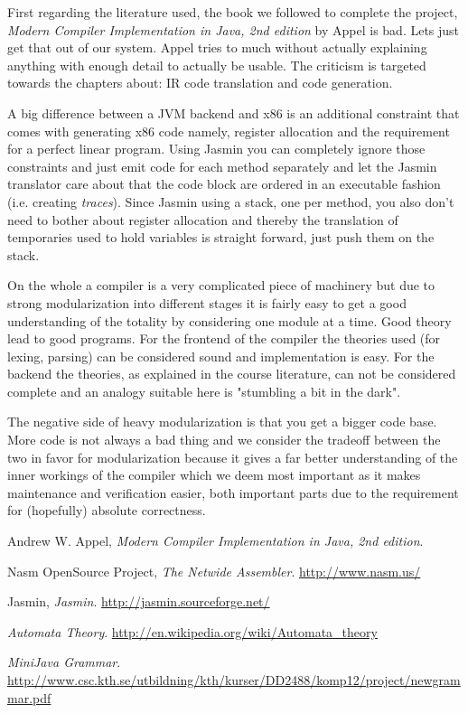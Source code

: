 \documentclass[11pt]{amsart}
\begin{document}
First regarding the literature used, the book we followed to complete the project, \textit{Modern Compiler Implementation in Java, 2nd edition} by Appel\cite{appel} is bad. Lets just get that out of our system. Appel tries to much without actually explaining anything with enough detail to actually be usable. The criticism is targeted towards the chapters about: IR code translation and code generation.

A big difference between a JVM backend and x86 is an additional constraint that comes with generating x86 code namely, register allocation and the requirement for a perfect linear program. Using Jasmin you can completely ignore those constraints and just emit code for each method separately and let the Jasmin translator care about that the code block are ordered in an executable fashion (i.e. creating \textit{traces}). Since Jasmin using a stack, one per method, you also don't need to bother about register allocation and thereby the translation of temporaries used to hold variables is straight forward, just push them on the stack.

On the whole a compiler is a very complicated piece of machinery but due to strong modularization into different stages it is fairly easy to get a good understanding of the totality by considering one module at a time. Good theory lead to good programs. For the frontend of the compiler the theories used (for lexing, parsing) can be considered sound and implementation is easy. For the backend the theories, as explained in the course literature, can not be considered complete and an analogy suitable here is "stumbling a bit in the dark".

The negative side of heavy modularization is that you get a bigger code base. More code is not always a bad thing and we consider the tradeoff between the two in favor for modularization because it gives a far better understanding of the inner workings of the compiler which we deem most important as it makes maintenance and verification easier, both important parts due to the requirement for (hopefully) absolute correctness.

\begin{thebibliography}{9}

	Andrew W. Appel,
	\emph{Modern Compiler Implementation in Java, 2nd edition}.

	Nasm OpenSource Project,
	\emph{The Netwide Assembler}.
	\url{http://www.nasm.us/}

	Jasmin,
	\emph{Jasmin}.
	\url{http://jasmin.sourceforge.net/}

	\emph{Automata Theory}.
	\url{http://en.wikipedia.org/wiki/Automata_theory}

	\emph{MiniJava Grammar}.
	\url{http://www.csc.kth.se/utbildning/kth/kurser/DD2488/komp12/project/newgrammar.pdf}

\end{thebibliography}
\end{document}
